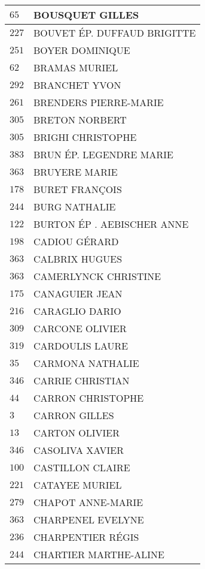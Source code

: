 \begin{xltabular}{\linewidth}{|l|X|}
    \hline
    $65$ & BOUSQUET GILLES \\
    \hline
    $227$ & BOUVET ÉP. DUFFAUD BRIGITTE \\
    \hline
    $251$ & BOYER DOMINIQUE \\
    \hline
    $62$ & BRAMAS MURIEL \\
    \hline
    $292$ & BRANCHET YVON \\
    \hline
    $261$ & BRENDERS PIERRE-MARIE \\
    \hline
    $305$ & BRETON NORBERT \\
    \hline
    $305$ & BRIGHI CHRISTOPHE \\
    \hline
    $383$ & BRUN ÉP. LEGENDRE MARIE \\
    \hline
    $363$ & BRUYERE MARIE \\
    \hline
    $178$ & BURET FRANÇOIS \\
    \hline
    $244$ & BURG NATHALIE \\
    \hline
    $122$ & BURTON ÉP . AEBISCHER ANNE \\
    \hline
    $198$ & CADIOU GÉRARD \\
    \hline
    $363$ & CALBRIX HUGUES \\
    \hline
    $363$ & CAMERLYNCK CHRISTINE \\
    \hline
    $175$ & CANAGUIER JEAN \\
    \hline
    $216$ & CARAGLIO DARIO \\
    \hline
    $309$ & CARCONE OLIVIER \\
    \hline
    $319$ & CARDOULIS LAURE \\
    \hline
    $35$ & CARMONA NATHALIE \\
    \hline
    $346$ & CARRIE CHRISTIAN \\
    \hline
    $44$ & CARRON CHRISTOPHE \\
    \hline
    $3$ & CARRON GILLES \\
    \hline
    $13$ & CARTON OLIVIER \\
    \hline
    $346$ & CASOLIVA XAVIER \\
    \hline
    $100$ & CASTILLON CLAIRE \\
    \hline
    $221$ & CATAYEE MURIEL \\
    \hline
    $279$ & CHAPOT ANNE-MARIE \\
    \hline
    $363$ & CHARPENEL EVELYNE \\
    \hline
    $236$ & CHARPENTIER RÉGIS \\
    \hline
    $244$ & CHARTIER MARTHE-ALINE \\

\end{xltabular}
